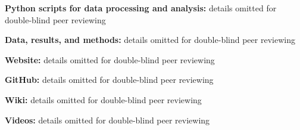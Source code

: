 \noindent
\textbf{Python scripts for data processing and analysis:}
details omitted for double-blind peer reviewing

\noindent
\textbf{Data, results, and methods:}
details omitted for double-blind peer reviewing

\noindent
\textbf{Website:}
details omitted for double-blind peer reviewing

\noindent
\textbf{GitHub:} 
details omitted for double-blind peer reviewing

\noindent
\textbf{Wiki:}
details omitted for double-blind peer reviewing

\noindent
\textbf{Videos:}
details omitted for double-blind peer reviewing







